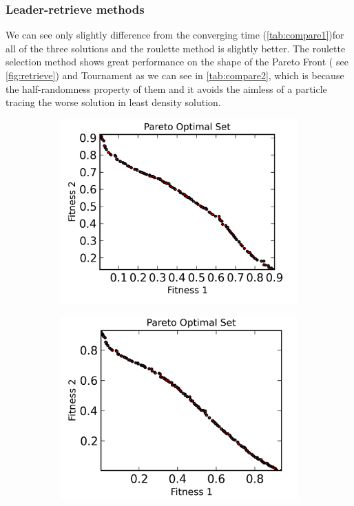\documentclass[12pt, runningheads,a4paper]{llncs}
\begin{document}
\subsubsection{Leader-retrieve methods}
We can see only slightly difference from the converging time (\ref{tab:compare1})for all of the three solutions and the roulette method is slightly better. The roulette selection method shows great performance on the shape of the Pareto Front ( see \ref{fig:retrieve}) and Tournament as we can see in \ref{tab:compare2}, which is because the half-randomness property of them and it avoids the aimless of a particle tracing the worse solution in least density solution.
\begin{figure}
        \centering
        \begin{subfigure}[b]{0.3\textwidth}
                \centering
                \includegraphics[width=\textwidth]{./figs/leastdensity.png}
        \end{subfigure}
        \begin{subfigure}[b]{0.3\textwidth}
                \centering
                \includegraphics[width=\textwidth]{./figs/tournament.png}

\end{subfigure}
\end{figure}
\end{document}
